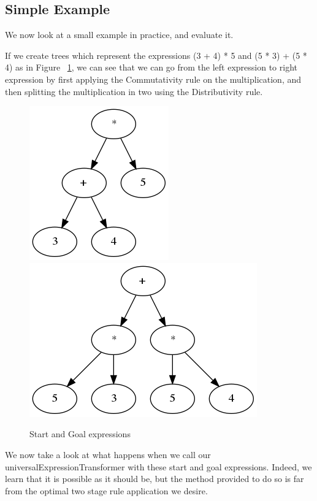 \documentclass{l4proj}
\begin{document}
\subsection{Simple Example}

We now look at a small example in practice, and evaluate it.


If we create trees which represent the expressions (3 + 4) * 5 and (5 * 3) + (5 * 4) as in Figure ~\ref{fig:CommutDis_Example}, we can see that we can go from the left expression to right expression by first applying the Commutativity rule on the multiplication, and then splitting the multiplication in two using the Distributivity rule.


\begin{figure}
    \centering
    \includegraphics[scale=0.4]{images/CommutDis0}
    \hspace{1cm}
    \includegraphics[scale=0.4]{images/CommutDis4}
    \caption{Start and Goal expressions}
    \label{fig:CommutDis_Example}
\end{figure}



We now take a look at what happens when we call our universalExpressionTransformer with these start and goal expressions.
Indeed, we learn that it is possible as it should be, but the method provided to do so is far from the optimal two stage rule application we desire.
\end{document}
